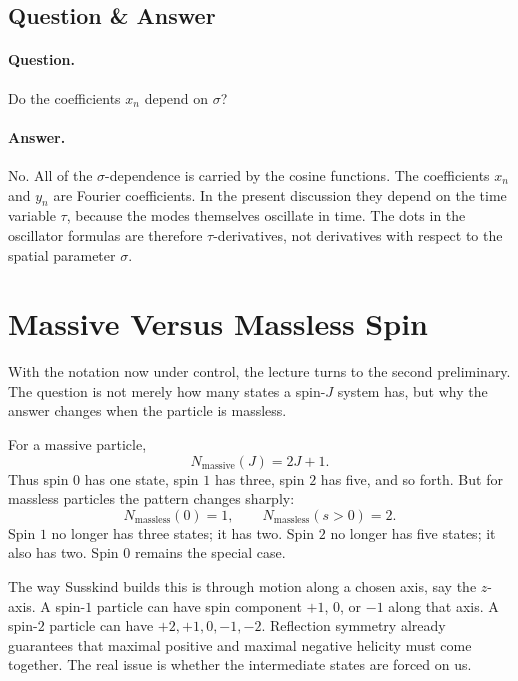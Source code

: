 \subsection{Question \& Answer}

\paragraph{Question.} Do the coefficients \(x_n\) depend on \(\sigma\)?

\paragraph{Answer.} No. All of the \(\sigma\)-dependence is carried by the cosine functions. The coefficients \(x_n\) and \(y_n\) are Fourier coefficients. In the present discussion they depend on the time variable \(\tau\), because the modes themselves oscillate in time. The dots in the oscillator formulas are therefore \(\tau\)-derivatives, not derivatives with respect to the spatial parameter \(\sigma\).

\section{Massive Versus Massless Spin}

With the notation now under control, the lecture turns to the second preliminary. The question is not merely how many states a spin-\(J\) system has, but why the answer changes when the particle is massless.

For a massive particle,
\begin{equation}
N_{\mathrm{massive}}(J)=2J+1.
\end{equation}
Thus spin \(0\) has one state, spin \(1\) has three, spin \(2\) has five, and so forth. But for massless particles the pattern changes sharply:
\begin{equation}
N_{\mathrm{massless}}(0)=1,\qquad
N_{\mathrm{massless}}(s>0)=2.
\end{equation}
Spin \(1\) no longer has three states; it has two. Spin \(2\) no longer has five states; it also has two. Spin \(0\) remains the special case.

The way Susskind builds this is through motion along a chosen axis, say the \(z\)-axis. A spin-\(1\) particle can have spin component \(+1\), \(0\), or \(-1\) along that axis. A spin-\(2\) particle can have \(+2,+1,0,-1,-2\). Reflection symmetry already guarantees that maximal positive and maximal negative helicity must come together. The real issue is whether the intermediate states are forced on us.

